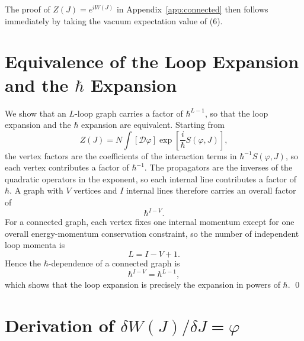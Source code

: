 The proof of $Z(J) = e^{iW(J)}$ in Appendix~\ref{app:connected} then
follows immediately by taking the vacuum expectation value of (6).


\chapter{Equivalence of the Loop Expansion and the \texorpdfstring{$\hbar$}{hbar} Expansion}
\label{app:loop-hbar}

We show that an $L$-loop graph carries a factor of $\hbar^{L-1}$, so
that the loop expansion and the $\hbar$ expansion are equivalent. Starting
from
\begin{equation}
	Z(J) = N\int[\mathcal{D}\varphi]
	\exp\!\left[\frac{i}{\hbar}S(\varphi,J)\right],
\end{equation}
the vertex factors are the coefficients of the interaction terms in
$\hbar^{-1}S(\varphi,J)$, so each vertex contributes a factor of
$\hbar^{-1}$. The propagators are the inverses of the quadratic operators
in the exponent, so each internal line contributes a factor of $\hbar$.
A graph with $V$ vertices and $I$ internal lines therefore carries an
overall factor of
\begin{equation}
	\hbar^{I-V}.
\end{equation}
For a connected graph, each vertex fixes one internal momentum except for
one overall energy-momentum conservation constraint, so the number of
independent loop momenta is
\begin{equation}
	L = I - V + 1.
\end{equation}
Hence the $\hbar$-dependence of a connected graph is
\begin{equation}
	\hbar^{I-V} = \hbar^{L-1},
\end{equation}
which shows that the loop expansion is precisely the expansion in powers
of $\hbar$. \qed


\chapter{Derivation of \texorpdfstring{$\delta W(J)/\delta J = \varphi$}{dW/dJ = phi}}
\label{app:delta-W-delta-J}

